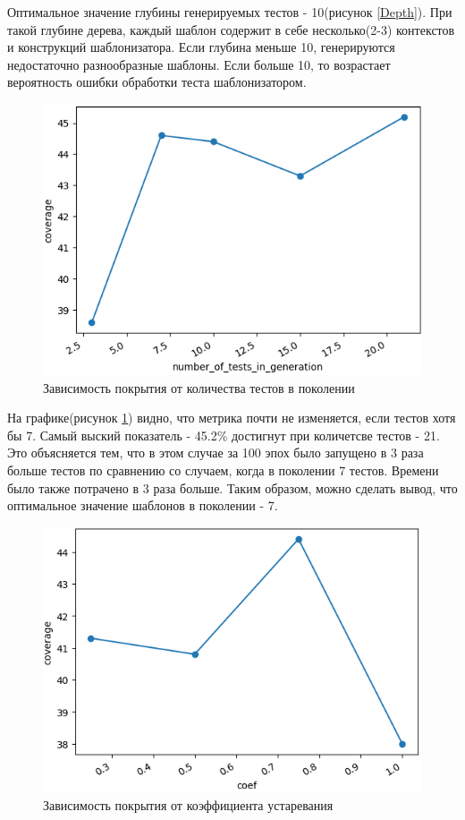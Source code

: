 \documentclass[a4paper]{article}
\begin{document}
Оптимальное значение глубины генерируемых тестов - 10(рисунок \ref{Depth}). При такой глубине дерева, каждый шаблон содержит в себе несколько(2-3) контекстов и конструкций шаблонизатора. Если глубина меньше 10, генерируются недостаточно разнообразные шаблоны. Если больше 10, то возрастает вероятность ошибки обработки теста шаблонизатором.

\begin{figure}[ht!]
    \includegraphics[width=170mm]{generation.png}
    \caption{Зависимость покрытия от количества тестов в поколении}
    \label{Generation}
    \end{figure}

На графике(рисунок \ref{Generation}) видно, что метрика почти не изменяется, если тестов хотя бы 7. Самый выский показатель - 45.2\% достигнут при количетсве тестов - 21. Это объясняется тем, что в этом случае за 100 эпох было запущено в 3 раза больше тестов по сравнению со случаем, когда в поколении 7 тестов. Времени было также потрачено в 3 раза больше. Таким образом, можно сделать вывод, что оптимальное значение шаблонов в поколении - 7.

\begin{figure}[ht!]
    \includegraphics[width=160mm]{coef.png}
    \caption{Зависимость покрытия от коэффициента устаревания}
    \label{Coef}
    \end{figure}
\end{document}
